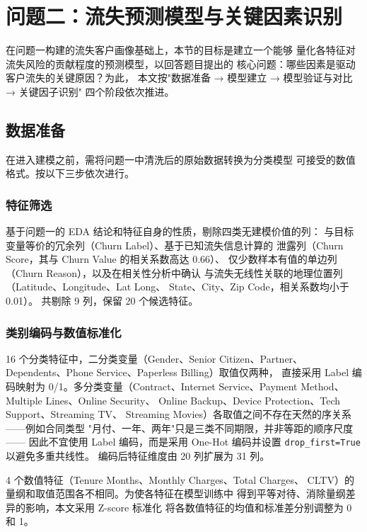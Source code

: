 \section{问题二：流失预测模型与关键因素识别}

在问题一构建的流失客户画像基础上，本节的目标是建立一个能够
量化各特征对流失风险的贡献程度的预测模型，以回答题目提出的
核心问题：哪些因素是驱动客户流失的关键原因？为此，
本文按"数据准备 → 模型建立 → 模型验证与对比 → 关键因子识别"
四个阶段依次推进。

\subsection{数据准备}

在进入建模之前，需将问题一中清洗后的原始数据转换为分类模型
可接受的数值格式。按以下三步依次进行。

\subsubsection*{特征筛选}

基于问题一的 EDA 结论和特征自身的性质，剔除四类无建模价值的列：
与目标变量等价的冗余列（Churn Label）、基于已知流失信息计算的
泄露列（Churn Score，其与 Churn Value 的相关系数高达 0.66）、
仅少数样本有值的单边列（Churn Reason），以及在相关性分析中确认
与流失无线性关联的地理位置列（Latitude、Longitude、Lat Long、
State、City、Zip Code，相关系数均小于 0.01）。
共剔除 9 列，保留 20 个候选特征。

\subsubsection*{类别编码与数值标准化}

16 个分类特征中，二分类变量（Gender、Senior Citizen、Partner、
Dependents、Phone Service、Paperless Billing）取值仅两种，
直接采用 Label 编码映射为 0/1。多分类变量（Contract、Internet
Service、Payment Method、Multiple Lines、Online Security、
Online Backup、Device Protection、Tech Support、Streaming TV、
Streaming Movies）各取值之间不存在天然的序关系——例如合同类型
"月付、一年、两年"只是三类不同期限，并非等距的顺序尺度——
因此不宜使用 Label 编码，而是采用 One-Hot 编码并设置
\texttt{drop\_first=True} 以避免多重共线性。
编码后特征维度由 20 列扩展为 31 列。

4 个数值特征（Tenure Months、Monthly Charges、Total Charges、
CLTV）的量纲和取值范围各不相同。为使各特征在模型训练中
得到平等对待、消除量纲差异的影响，本文采用 Z-score 标准化
将各数值特征的均值和标准差分别调整为 0 和 1。

